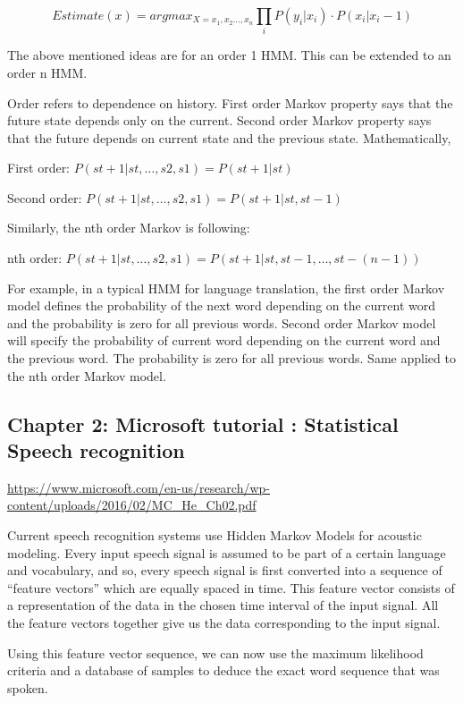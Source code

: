 \[Estimate(x) = argmax_{X = x_1, x_2..., x_n} \displaystyle\prod_i P(y_i|x_i)\cdot P(x_i|x_i-1)\]

The above mentioned ideas are for an order 1 HMM. This can be extended
to an order n HMM.

Order refers to dependence on history. First order Markov property says
that the future state depends only on the current. Second order Markov
property says that the future depends on current state and the previous
state. Mathematically,

First order: \(P(st+1|st,…,s2,s1) = P(st+1|st)\)

Second order: \(P(st+1|st,…,s2,s1) = P(st+1|st,st−1)\)

Similarly, the nth order Markov is following:

nth order: \(P(st+1|st,…,s2,s1) = P(st+1|st,st−1,…,st−(n−1))\)

For example, in a typical HMM for language translation, the first order
Markov model defines the probability of the next word depending on the
current word and the probability is zero for all previous words. Second
order Markov model will specify the probability of current word
depending on the current word and the previous word. The probability is
zero for all previous words. Same applied to the nth order Markov model.

\hypertarget{chapter-2-microsoft-tutorial-statistical-speech-recognition}{%
\subsection{Chapter 2: Microsoft tutorial : Statistical Speech
recognition}\label{chapter-2-microsoft-tutorial-statistical-speech-recognition}}

\url{https://www.microsoft.com/en-us/research/wp-content/uploads/2016/02/MC_He_Ch02.pdf}

Current speech recognition systems use Hidden Markov Models for acoustic
modeling. Every input speech signal is assumed to be part of a certain
language and vocabulary, and so, every speech signal is first converted
into a sequence of ``feature vectors'' which are equally spaced in time.
This feature vector consists of a representation of the data in the
chosen time interval of the input signal. All the feature vectors
together give us the data corresponding to the input signal.

Using this feature vector sequence, we can now use the maximum
likelihood criteria and a database of samples to deduce the exact word
sequence that was spoken.

